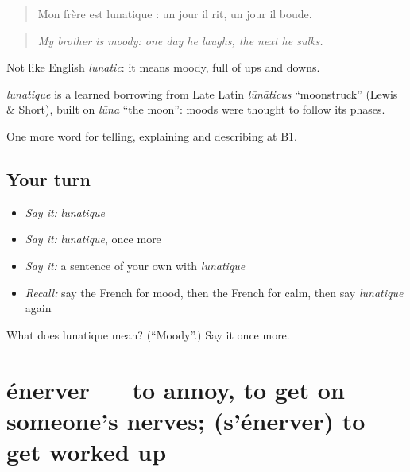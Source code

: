 \begin{quote}
Mon frère est lunatique : un jour il rit, un jour il boude.
\end{quote}

\begin{quote}
\emph{My brother is moody: one day he laughs, the next he sulks.}
\end{quote}

Not like English \emph{lunatic}: it means moody, full of ups and downs.

\begin{cousinweb}
\emph{lunatique} is a learned borrowing from Late Latin \emph{lūnāticus} \textquotedblleft{}moonstruck\textquotedblright{} (Lewis \& Short), built on \emph{lūna} \textquotedblleft{}the moon\textquotedblright{}: moods were thought to follow its phases.
\end{cousinweb}

\begin{grammarlens}[title={What you've built}]
One more word for telling, explaining and describing at B1.
\end{grammarlens}

\subsection*{Your turn}
\begin{itemize}
\raggedright
  \item \emph{Say it:} \emph{lunatique}
  \item \emph{Say it:} \emph{lunatique}, once more
  \item \emph{Say it:} a sentence of your own with \emph{lunatique}
  \item \emph{Recall:} say the French for mood, then the French for calm, then say \emph{lunatique} again
\end{itemize}

\begin{tcolorbox}[breakable,colback=teal!4,colframe=teal!35!black,title={Before you move on}]
What does lunatique mean? (\textquotedblleft{}Moody\textquotedblright{}.) Say it once more.
\end{tcolorbox}
\section[énerver]{énerver — to annoy, to get on someone's nerves; (s'énerver) to get worked up}

\label{lesson:FR-C469-enerver}



